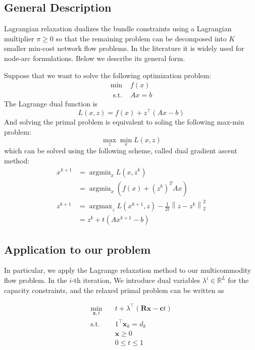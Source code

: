 \subsection{General Description}
Lagrangian relaxation dualizes the bundle constraints using a Lagrangian multiplier $\pi\geq 0$ so that the remaining problem
can be decomposed into $K$ smaller min-cost network flow problems. In the literature it is widely used for node-arc formulations. Below we describe its general form.

Suppose that we want to solve the following optimization problem:
\begin{equation}\begin{array}{cl}
\min & f(x) \\
\text { s.t. } & A x=b
\end{array}\end{equation}
The Lagrange dual function is \begin{equation}L(x, z)=f(x)+z^{\top}(A x-b)\end{equation}
And solving the primal problem is equivalent to soling the following max-min problem:
\begin{equation}\max _{z} \min _{x} L(x, z)\end{equation}
which can be solved using the following scheme, called dual gradient ascent method:
\begin{equation}\begin{aligned}
x^{k+1} &=\operatorname{argmin}_{x} L\left(x, z^{k}\right) \\
&=\operatorname{argmin}_{x}\left(f(x)+\left(z^{k}\right)^{T} A x\right) \\
z^{k+1} &=\operatorname{argmax}_{z} L\left(x^{k+1}, z\right)-\frac{1}{2 t}\left\|z-z^{k}\right\|_{2}^{2} \\
&=z^{k}+t\left(A x^{k+1}-b\right)
\end{aligned}\end{equation}



\subsection{Application to our problem}
In particular, we apply the Lagrange relaxation method to our multicommodity flow problem. In the $i$-th iteration, We introduce dual variables $\lambda^{i} \in \mathbb{R}^{L}$ for the capacity constraints, and the relaxed primal problem can be written as

\begin{subequations}
\begin{align}
\min _{\mathbf{x},t} \quad & t+\lambda^{\top}\left(\mathbf{R x} - \mathbf{c}t\right)\\
\text {s.t.} \quad
& 1^\top \mathbf{x}_{k}=d_{k}  \\
& \mathbf{x} \geq 0 \\
& 0\leq t \leq 1
\end{align}
\end{subequations}

